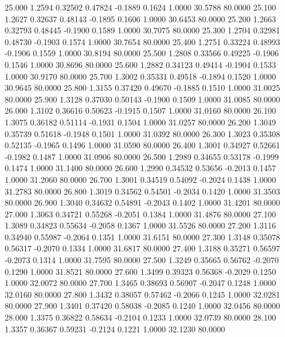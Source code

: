   25.000   1.2594   0.32502   0.47824  -0.1889   0.1624   1.0000  30.5788  80.0000
  25.100   1.2627   0.32637   0.48143  -0.1895   0.1606   1.0000  30.6453  80.0000
  25.200   1.2663   0.32793   0.48445  -0.1900   0.1589   1.0000  30.7075  80.0000
  25.300   1.2704   0.32981   0.48730  -0.1903   0.1574   1.0000  30.7654  80.0000
  25.400   1.2751   0.33224   0.48993  -0.1906   0.1559   1.0000  30.8194  80.0000
  25.500   1.2808   0.33566   0.49225  -0.1906   0.1546   1.0000  30.8696  80.0000
  25.600   1.2882   0.34123   0.49414  -0.1904   0.1533   1.0000  30.9170  80.0000
  25.700   1.3002   0.35331   0.49518  -0.1894   0.1520   1.0000  30.9645  80.0000
  25.800   1.3155   0.37420   0.49670  -0.1885   0.1510   1.0000  31.0025  80.0000
  25.900   1.3128   0.37030   0.50143  -0.1900   0.1509   1.0000  31.0085  80.0000
  26.000   1.3102   0.36616   0.50623  -0.1915   0.1507   1.0000  31.0160  80.0000
  26.100   1.3075   0.36182   0.51114  -0.1931   0.1504   1.0000  31.0257  80.0000
  26.200   1.3049   0.35739   0.51618  -0.1948   0.1501   1.0000  31.0392  80.0000
  26.300   1.3023   0.35308   0.52135  -0.1965   0.1496   1.0000  31.0590  80.0000
  26.400   1.3001   0.34927   0.52661  -0.1982   0.1487   1.0000  31.0906  80.0000
  26.500   1.2989   0.34655   0.53178  -0.1999   0.1474   1.0000  31.1400  80.0000
  26.600   1.2990   0.34532   0.53656  -0.2013   0.1457   1.0000  31.2060  80.0000
  26.700   1.3001   0.34519   0.54092  -0.2024   0.1438   1.0000  31.2783  80.0000
  26.800   1.3019   0.34562   0.54501  -0.2034   0.1420   1.0000  31.3503  80.0000
  26.900   1.3040   0.34632   0.54891  -0.2043   0.1402   1.0000  31.4201  80.0000
  27.000   1.3063   0.34721   0.55268  -0.2051   0.1384   1.0000  31.4876  80.0000
  27.100   1.3089   0.34823   0.55634  -0.2058   0.1367   1.0000  31.5526  80.0000
  27.200   1.3116   0.34940   0.55987  -0.2064   0.1351   1.0000  31.6151  80.0000
  27.300   1.3148   0.35078   0.56317  -0.2070   0.1334   1.0000  31.6817  80.0000
  27.400   1.3188   0.35271   0.56597  -0.2073   0.1314   1.0000  31.7595  80.0000
  27.500   1.3249   0.35665   0.56762  -0.2070   0.1290   1.0000  31.8521  80.0000
  27.600   1.3499   0.39323   0.56368  -0.2029   0.1250   1.0000  32.0072  80.0000
  27.700   1.3465   0.38693   0.56907  -0.2047   0.1248   1.0000  32.0160  80.0000
  27.800   1.3432   0.38057   0.57462  -0.2066   0.1245   1.0000  32.0281  80.0000
  27.900   1.3401   0.37420   0.58038  -0.2085   0.1240   1.0000  32.0456  80.0000
  28.000   1.3375   0.36822   0.58634  -0.2104   0.1233   1.0000  32.0739  80.0000
  28.100   1.3357   0.36367   0.59231  -0.2124   0.1221   1.0000  32.1230  80.0000

